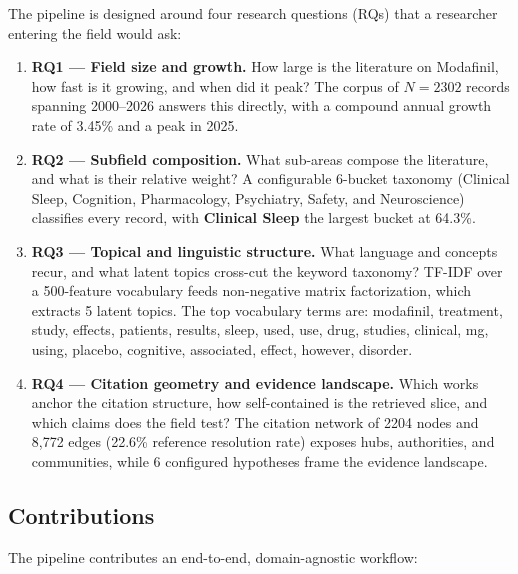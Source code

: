 \documentclass[
  english,
]{article}
\begin{document}
The pipeline is designed around four research questions (RQs) that a
researcher entering the field would ask:

\begin{enumerate}
\def\labelenumi{\arabic{enumi}.}
\item
  \textbf{RQ1 --- Field size and growth.} How large is the literature on
  Modafinil, how fast is it growing, and when did it peak? The corpus of
  \(N = 2302\) records spanning 2000--2026 answers this directly, with a
  compound annual growth rate of 3.45\% and a peak in 2025.
\item
  \textbf{RQ2 --- Subfield composition.} What sub-areas compose the
  literature, and what is their relative weight? A configurable 6-bucket
  taxonomy (Clinical Sleep, Cognition, Pharmacology, Psychiatry, Safety,
  and Neuroscience) classifies every record, with \textbf{Clinical
  Sleep} the largest bucket at 64.3\%.
\item
  \textbf{RQ3 --- Topical and linguistic structure.} What language and
  concepts recur, and what latent topics cross-cut the keyword taxonomy?
  TF-IDF over a 500-feature vocabulary feeds non-negative matrix
  factorization, which extracts 5 latent topics. The top vocabulary
  terms are: modafinil, treatment, study, effects, patients, results,
  sleep, used, use, drug, studies, clinical, mg, using, placebo,
  cognitive, associated, effect, however, disorder.
\item
  \textbf{RQ4 --- Citation geometry and evidence landscape.} Which works
  anchor the citation structure, how self-contained is the retrieved
  slice, and which claims does the field test? The citation network of
  2204 nodes and 8,772 edges (22.6\% reference resolution rate) exposes
  hubs, authorities, and communities, while 6 configured hypotheses
  frame the evidence landscape.
\end{enumerate}

\subsection{Contributions}\label{contributions}

The pipeline contributes an end-to-end, domain-agnostic workflow:
\end{document}
